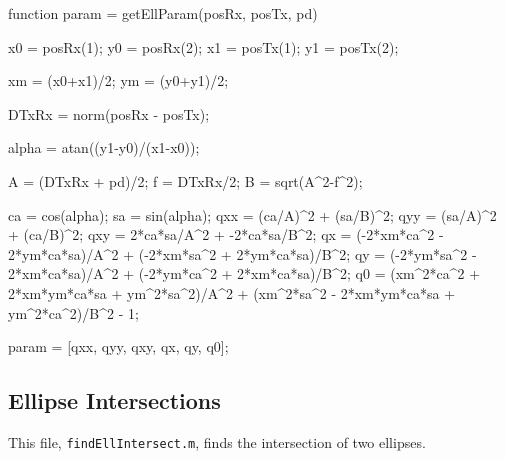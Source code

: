 \documentclass[12pt,openany,a4paper]{book}
\begin{document}
\begin{spverbatim}
function param = getEllParam(posRx, posTx, pd)
%
%

x0 = posRx(1); y0 = posRx(2);
x1 = posTx(1); y1 = posTx(2);

xm = (x0+x1)/2;
ym = (y0+y1)/2;

DTxRx = norm(posRx - posTx);

alpha = atan((y1-y0)/(x1-x0));

A = (DTxRx + pd)/2;
f = DTxRx/2;
B = sqrt(A^2-f^2);

ca = cos(alpha);
sa = sin(alpha);
qxx = (ca/A)^2 + (sa/B)^2;
qyy = (sa/A)^2 + (ca/B)^2;
qxy = 2*ca*sa/A^2 + -2*ca*sa/B^2;
qx = (-2*xm*ca^2 - 2*ym*ca*sa)/A^2 + (-2*xm*sa^2 + 2*ym*ca*sa)/B^2;
qy = (-2*ym*sa^2 - 2*xm*ca*sa)/A^2 + (-2*ym*ca^2 + 2*xm*ca*sa)/B^2;
q0 = (xm^2*ca^2 + 2*xm*ym*ca*sa + ym^2*sa^2)/A^2 + (xm^2*sa^2 - 2*xm*ym*ca*sa + ym^2*ca^2)/B^2 - 1; 
    
param = [qxx, qyy, qxy, qx, qy, q0];
\end{spverbatim}

\subsection{Ellipse Intersections}
This file, \verb+findEllIntersect.m+, finds the intersection of two ellipses.
\end{document}
